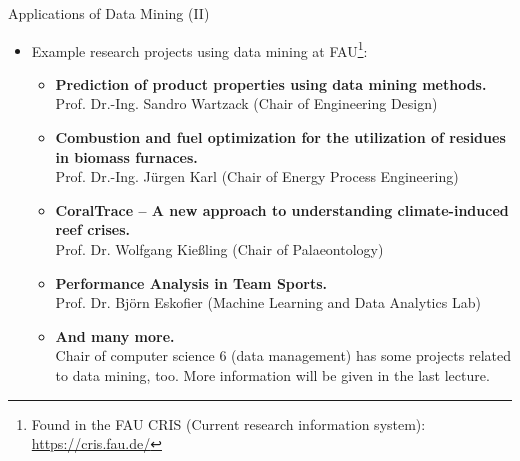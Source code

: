 \begin{frame}{Applications of Data Mining (II)}
	\begin{itemize}
		\item Example research projects using data mining at FAU\footnote{Found
			      in the FAU CRIS (Current research information system):
			      \url{https://cris.fau.de/}}:
		      \begin{itemize}
			      \item \textbf{Prediction of product properties using data mining
				            methods.} \\
			            \small{Prof. Dr.-Ing. Sandro Wartzack (Chair of Engineering
				            Design)}
			      \item \textbf{Combustion and fuel optimization for the utilization
				            of residues in biomass furnaces.} \\
			            \small{Prof. Dr.-Ing. Jürgen Karl (Chair of Energy Process
				            Engineering)}
			      \item \textbf{CoralTrace – A new approach to understanding
				            climate-induced reef crises.} \\
			            \small{Prof. Dr. Wolfgang Kießling (Chair of Palaeontology)}
			      \item \textbf{Performance Analysis in Team Sports.} \\
			            \small{Prof. Dr. Björn Eskofier (Machine Learning and Data
				            Analytics Lab)}
			      \item \textbf{And many more.} \\
			            \small{Chair of computer science 6 (data management)
				            has some projects related to data mining, too. More
				            information will be given in the last lecture.}
		      \end{itemize}
	\end{itemize}
\end{frame}
